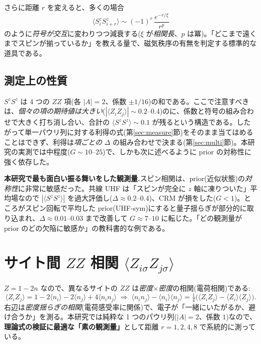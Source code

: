 \documentclass[11pt,a4paper]{ltjsarticle}
\newcommand{\ev}[1]{\langle #1\rangle}
\begin{document}
さらに距離 $r$ を変えると、多くの場合
\begin{equation}
  \ev{S^z_iS^z_{i+r}} \sim (-1)^r\,\frac{e^{-r/\xi}}{r^{p}}
\end{equation}
のように\emph{符号が交互}に変わりつつ減衰する($\xi$ が\emph{相関長}、$p$ は冪)。「どこまで遠くまでスピンが揃っているか」を教える量で、磁気秩序の有無を判定する標準的な道具である。

\subsection{測定上の性質}
$S^zS^z$ は 4 つの $ZZ$ 項(各 $|A|=2$、係数 $\pm1/16$)の和である。ここで注意すべきは、\emph{個々の項の期待値は大きい}($|\ev{Z_iZ_j}|\sim0.2$--$0.4$)のに、係数と符号の組み合わせで大きく打ち消し合い、合計の $\ev{S^zS^z}\sim0.1$ が残るという構造である。したがって単一パウリ列に対する利得の式(第\ref{sec:measure}節)をそのまま当てはめることはできず、利得は\emph{項ごとの} $\Delta$ の組み合わせで決まる(第\ref{sec:multi}節)。本研究の実測では中程度($G\sim10$--$25$)で、しかも次に述べるように prior の対称性に強く依存した。

\begin{exbox}
\textbf{本研究で最も面白い振る舞いをした観測量.}スピン相関は、prior(近似状態)の\emph{対称性}に非常に敏感だった。共線 UHF は「スピンが完全に $z$ 軸に凍りついた」平均場なので $|\ev{S^zS^z}|$ を過大評価し($\Delta\approx0.2$--$0.4$)、CRM が損をした($G<1$)。ところがスピン回転で平均した prior(UHF-sym)にすると量子揺らぎが部分的に取り込まれ、$\Delta\approx0.01$--$0.03$ まで改善して $G\approx7$--$10$ に転じた。「どの観測量が prior のどの欠陥に敏感か」の教科書的な例である。
\end{exbox}

\section{サイト間 $ZZ$ 相関 $\ev{Z_{i\sigma}Z_{j\sigma}}$}
\label{sec:zz-inter}

$Z=1-2n$ なので、異なるサイトの $ZZ$ は\emph{密度$\times$密度}の相関(電荷相関)である:
\begin{equation}
  \ev{Z_iZ_j} = 1-2\ev{n_i}-2\ev{n_j}+4\ev{n_in_j}
  \;\Longrightarrow\;
  \ev{n_in_j}-\ev{n_i}\ev{n_j} = \tfrac14\bigl(\ev{Z_iZ_j}-\ev{Z_i}\ev{Z_j}\bigr).
\end{equation}
右辺は\emph{密度揺らぎの相関}(電荷感受率に関係)で、電子が「一緒にいたがるか、避け合うか」を測る。本研究では純粋な 1 つのパウリ列($|A|=2$、係数 $1$)なので、\textbf{理論式の検証に最適な「素の観測量」}として距離 $r=1,2,4,8$ で系統的に測っている。
\end{document}
